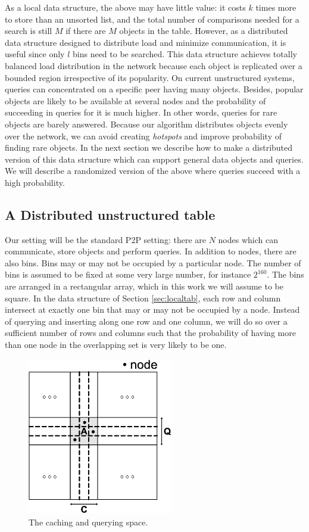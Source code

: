 As a local data structure, the above may have little value: it costs $k$ times
more to store than an unsorted list, and the total number of comparisons
needed for a search is still $M$ if there are $M$ objects in the table.
However, as a distributed data structure designed to distribute load and
minimize communication, it is useful since only $l$ bins need to be searched.
This data structure achieves totally balanced load distribution 
in the network because each object is replicated over a bounded region 
irrespective of its popularity. On current unstructured systems, queries 
can concentrated on a specific peer having many objects. Besides, popular objects 
are likely to be available at several nodes and the probability of succeeding in
queries for it is much higher. In other words, queries for rare
objects are barely 
answered. Because our algorithm distributes objects 
evenly over the network, we can avoid creating \emph{hotspots} and improve 
probability of finding rare objects.
In the next section we describe how to
make a distributed version of this data structure which can support general
data objects and queries.  We will describe a randomized version of the above
where queries succeed with a high probability.

\subsection{A Distributed unstructured table}
\label{sec:table}
Our setting will be the standard P2P setting: there are $N$ nodes which can
communicate, store objects and perform queries.  In addition to nodes, there
are also bins.  Bins may or may not be occupied by a particular node.  The
number of bins is assumed to be fixed at some very large number, for instance
$2^{160}$.  The bins are arranged in a rectangular array, which in this work
we will assume to be square.  In the data structure of
Section \ref{sec:localtab}, each row and column intersect at exactly one
bin that may or may not be occupied by a node.  Instead of
querying and inserting along one row and one column, we will do so over a
sufficient number of rows and columns such that the probability of having 
more than one node in the overlapping set is very likely to be one.
\begin{figure}
\centering
\includegraphics[width=2.5in]{space}
\caption{The caching and querying space.} \label{fig:space}
\end{figure}

